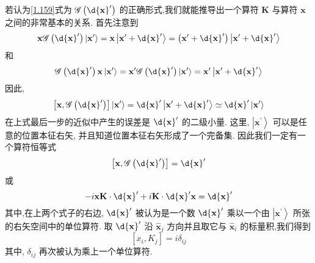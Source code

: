 \documentclass[lang=cn,newtx,10pt,scheme=chinese,thmcnt=section]{elegantbook}
\begin{document}
若认为\ref{1.159}式为 $\mathscr{G}\left( {\d{\mathbf{x}}^{\prime }}\right)$ 的正确形式,我们就能推导出一个算符 $\mathbf{K}$ 与算符 $\mathbf{x}$ 之间的非常基本的关系. 首先注意到
\begin{equation}
	\mathbf{x}\mathscr{G}\left( {\d{\mathbf{x}}^{\prime }}\right) \left| {\mathbf{x}}^{\prime }\right\rangle = \mathbf{x}\left| {{\mathbf{x}}^{\prime } + \d{\mathbf{x}}^{\prime }}\right\rangle = \left( {{\mathbf{x}}^{\prime } + \d{\mathbf{x}}^{\prime }}\right) \left| {{\mathbf{x}}^{\prime } + \d{\mathbf{x}}^{\prime }}\right\rangle
\end{equation}
和
\begin{equation}
	\mathscr{G}\left( {\d{\mathbf{x}}^{\prime }}\right) \mathbf{x}\left| {\mathbf{x}}^{\prime }\right\rangle = {\mathbf{x}}^{\prime }\mathscr{G}\left( {\d{\mathbf{x}}^{\prime }}\right) \left| {\mathbf{x}}^{\prime }\right\rangle = {\mathbf{x}}^{\prime }\left| {{\mathbf{x}}^{\prime } + \d{\mathbf{x}}^{\prime }}\right\rangle
\end{equation}
因此,
\begin{equation}
	\left\lbrack {\mathbf{x},\mathscr{G}\left( {\d{\mathbf{x}}^{\prime }}\right) }\right\rbrack \left| {\mathbf{x}}^{\prime }\right\rangle = \d{\mathbf{x}}^{\prime }\left| {{\mathbf{x}}^{\prime } + \d{\mathbf{x}}^{\prime }}\right\rangle \simeq \d{\mathbf{x}}^{\prime }\left| {\mathbf{x}}^{\prime }\right\rangle
\end{equation}
在上式最后一步的近似中产生的误差是 $\d{\mathbf{x}}^{\prime }$ 的二级小量. 这里, $\left| {\mathbf{x}}^{\prime }\right\rangle$ 可以是任意的位置本征右矢, 并且知道位置本征右矢形成了一个完备集. 因此我们一定有一个算符恒等式
\begin{equation}
	\left\lbrack {\mathbf{x}, \mathscr{G}\left( {\d{\mathbf{x}}^{\prime }}\right) }\right\rbrack = \d{\mathbf{x}}^{\prime }
\end{equation}
或
\begin{equation}
	- i\mathbf{x}\mathbf{K} \cdot \d{\mathbf{x}}^{\prime } + i\mathbf{K} \cdot \d{\mathbf{x}}^{\prime }\mathbf{x} = \d{\mathbf{x}}^{\prime }
\end{equation}
其中,在上两个式子的右边, $\d{\mathbf{x}}^{\prime }$ 被认为是一个数 $\d{\mathbf{x}}^{\prime }$ 乘以一个由 $\left| {\mathbf{x}}^{\prime }\right\rangle$ 所张的右矢空间中的单位算符. 取 $\d{\mathbf{x}}^{\prime }$ 沿 ${\widehat{\mathbf{x}}}_{j}$ 方向并且取它与 ${\widehat{\mathbf{x}}}_{i}$ 的标量积,我们得到
\begin{equation}
	\left\lbrack {{x}_{i},{K}_{j}}\right\rbrack = i{\delta }_{ij}
\end{equation}
其中, ${\delta }_{ij}$ 再次被认为乘上一个单位算符.
\end{document}
